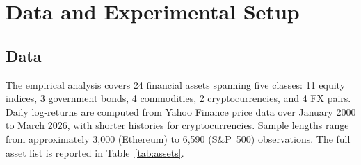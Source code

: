 \documentclass[preprint,11pt,authoryear]{elsarticle}
\newcommand{\1}{\boldsymbol{1}}
\begin{document}
	\section{Data and Experimental Setup}
	\label{sec:data}
	
	\subsection{Data}
	
	The empirical analysis covers 24 financial assets spanning five
	classes: 11 equity indices, 3 government bonds, 4 commodities,
	2 cryptocurrencies, and 4 FX pairs. Daily log-returns are
	computed from Yahoo Finance price data over January 2000 to
	March 2026, with shorter histories for cryptocurrencies. Sample
	lengths range from approximately 3,000 (Ethereum) to 6,590
	(S\&P~500) observations. The full asset list is reported in
	Table~\ref{tab:assets}.
	
\end{document}
